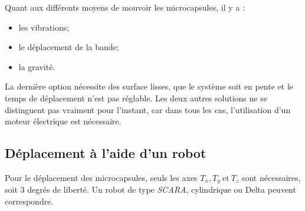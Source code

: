 Quant aux différents moyens de mouvoir les microcapsules, il y a : 
\begin{itemize}
    \item les vibrations;
    \item le déplacement de la bande;
    \item la gravité.
\end{itemize}

La dernière option nécessite des surface lisses, que le système soit en pente et le temps de déplacement n'est pas réglable. Les deux autres solutions ne se distinguent pas vraiment pour l'instant, car dans tous les cas, l'utilisation d'un moteur électrique est nécessaire.

\subsection*{Déplacement à l'aide d'un robot}
Pour le déplacement des microcapsules, seuls les axes $T_x, T_y~\text{et}~T_z$ sont nécessaires, soit $3$ degrés de liberté. Un robot de type \textit{SCARA}, cylindrique ou Delta peuvent correspondre.

